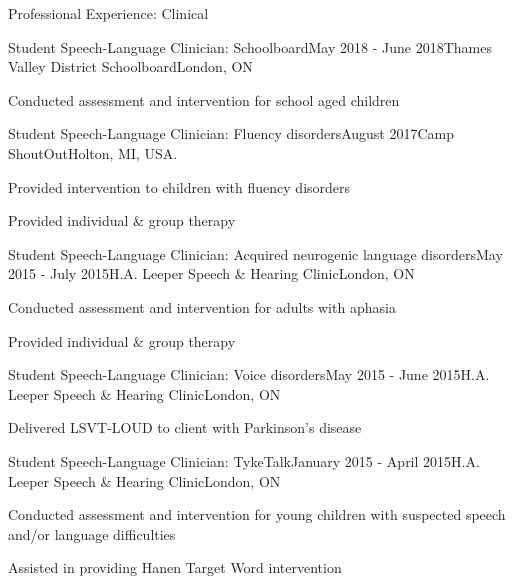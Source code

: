 \documentclass{resume} %
\begin{document}
\begin{rSection}{Professional Experience: Clinical}

	\begin{rSubsection}{Student Speech-Language Clinician: Schoolboard}{May 2018 - June 2018}{Thames Valley District Schoolboard}{London, ON}
	\item Conducted assessment and intervention for school aged children
	\end{rSubsection}
	
	\begin{rSubsection}{Student Speech-Language Clinician: Fluency disorders}{August 2017}{Camp ShoutOut}{Holton, MI, USA.}
	\item Provided intervention to children with fluency disorders
	\item Provided individual \& group therapy
	\end{rSubsection}
	
	
	\begin{rSubsection}{Student Speech-Language Clinician: Acquired neurogenic language disorders}{May 2015 - July 2015}{H.A. Leeper Speech \& Hearing Clinic}{London, ON}
	\item Conducted assessment and intervention for adults with aphasia
	\item Provided individual \& group therapy
	\end{rSubsection}
	
	
	\begin{rSubsection}{Student Speech-Language Clinician: Voice disorders}{May 2015 - June 2015}{H.A. Leeper Speech \& Hearing Clinic}{London, ON}
	\item Delivered LSVT-LOUD to client with Parkinson's disease
	\end{rSubsection}
	
	
	\begin{rSubsection}{Student Speech-Language Clinician: TykeTalk}{January 2015 - April 2015}{H.A. Leeper Speech \& Hearing Clinic}{London, ON}
	\item Conducted assessment and intervention for young children with suspected speech and/or language difficulties
	\item Assisted in providing Hanen Target Word intervention
	\end{rSubsection}
\end{rSection}
\end{document}
